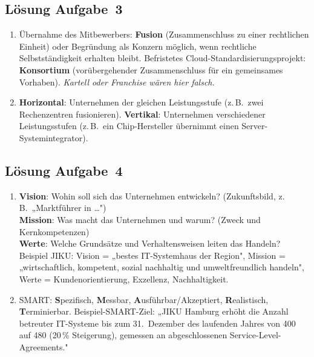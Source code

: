 \documentclass[11pt, a4paper]{article}
\begin{document}
\subsection*{Lösung Aufgabe~3}

\begin{enumerate}[label=(\alph*)]
  \item Übernahme des Mitbewerbers: \textbf{Fusion} (Zusammenschluss zu einer rechtlichen Einheit)
  oder Begründung als Konzern möglich, wenn rechtliche Selbstständigkeit erhalten bleibt.
  Befristetes Cloud-Standardisierungsprojekt: \textbf{Konsortium} (vorübergehender Zusammenschluss
  für ein gemeinsames Vorhaben). \textit{Kartell oder Franchise wären hier falsch.}

  \item \textbf{Horizontal}: Unternehmen der gleichen Leistungsstufe (z.\,B.\ zwei Rechenzentren
  fusionieren). \textbf{Vertikal}: Unternehmen verschiedener Leistungsstufen (z.\,B.\ ein
  Chip-Hersteller übernimmt einen Server-Systemintegrator).
\end{enumerate}

\subsection*{Lösung Aufgabe~4}

\begin{enumerate}[label=(\alph*)]
  \item \textbf{Vision}: Wohin soll sich das Unternehmen entwickeln? (Zukunftsbild, z.\,B.\ „Marktführer in …")\\
  \textbf{Mission}: Was macht das Unternehmen und warum? (Zweck und Kernkompetenzen)\\
  \textbf{Werte}: Welche Grundsätze und Verhaltensweisen leiten das Handeln?\\
  Beispiel JIKU: Vision = „bestes IT-Systemhaus der Region", Mission = „wirtschaftlich, kompetent,
  sozial nachhaltig und umweltfreundlich handeln", Werte = Kundenorientierung, Exzellenz, Nachhaltigkeit.

  \item SMART: \textbf{S}pezifisch, \textbf{M}essbar, \textbf{A}usführbar/Akzeptiert, \textbf{R}ealistisch,
  \textbf{T}erminierbar. Beispiel-SMART-Ziel: „JIKU Hamburg erhöht die Anzahl betreuter
  IT-Systeme bis zum 31.~Dezember des laufenden Jahres von 400 auf 480 (20\,\% Steigerung),
  gemessen an abgeschlossenen Service-Level-Agreements."
\end{enumerate}
\end{document}
